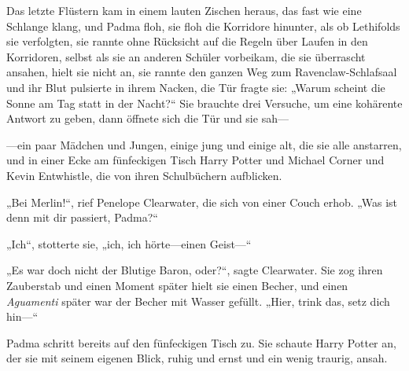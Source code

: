 Das letzte Flüstern kam in einem lauten Zischen heraus, das fast wie eine Schlange klang, und Padma floh, sie floh die Korridore hinunter, als ob Lethifolds sie verfolgten, sie rannte ohne Rücksicht auf die Regeln über Laufen in den Korridoren, selbst als sie an anderen Schüler vorbeikam, die sie überrascht ansahen, hielt sie nicht an, sie rannte den ganzen Weg zum Ravenclaw-Schlafsaal und ihr Blut pulsierte in ihrem Nacken, die Tür fragte sie: „Warum scheint die Sonne am Tag statt in der Nacht?“ Sie brauchte drei Versuche, um eine kohärente Antwort zu geben, dann öffnete sich die Tür und sie sah—

—ein paar Mädchen und Jungen, einige jung und einige alt, die sie alle anstarren, und in einer Ecke am fünfeckigen Tisch Harry Potter und Michael Corner und Kevin Entwhistle, die von ihren Schulbüchern aufblicken.

„Bei Merlin!“, rief Penelope Clearwater, die sich von einer Couch erhob. „Was ist denn mit dir passiert, Padma?“

„Ich“, stotterte sie, „ich, ich hörte—einen Geist—“

„Es war doch nicht der Blutige Baron, oder?“, sagte Clearwater. Sie zog ihren Zauberstab und einen Moment später hielt sie einen Becher, und einen \emph{Aguamenti} später war der Becher mit Wasser gefüllt. „Hier, trink das, setz dich hin—“

Padma schritt bereits auf den fünfeckigen Tisch zu. Sie schaute Harry Potter an, der sie mit seinem eigenen Blick, ruhig und ernst und ein wenig traurig, ansah.

